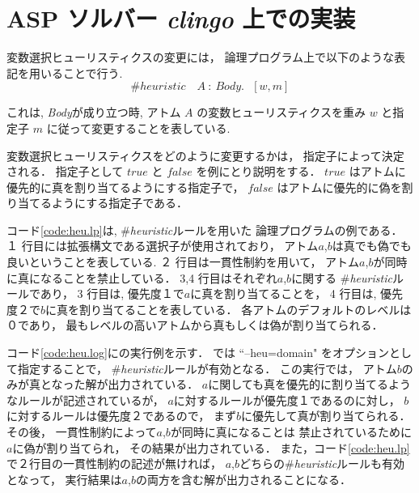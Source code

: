 \section{ASP ソルバー \textit{clingo} 上での実装}


変数選択ヒューリスティクスの変更には，
論理プログラム上で以下のような表記を用いることで行う. 
\begin{displaymath}
\#heuristic \quad A~ : ~Body. ~~~[w,m]
\end{displaymath}

これは, \textit{Body}が成り立つ時, アトム $A$ の変数ヒューリスティクスを重み
 $w$ と指定子 $m$ に従って変更することを表している. 

変数選択ヒューリスティクスをどのように変更するかは，
指定子によって決定される．
指定子として $true$ と $false$ を例にとり説明をする．
$true$ はアトムに優先的に真を割り当てるようにする指定子で，
$false$ はアトムに優先的に偽を割り当てるようにする指定子である．

コード\ref{code:heu.lp}は, \#\textit{heuristic}ルールを用いた
論理プログラムの例である．
１ 行目には拡張構文である選択子が使用されており，
アトム$a$,$b$は真でも偽でも良いということを表している. 
２ 行目は一貫性制約を用いて，
アトム$a$,$b$が同時に真になることを禁止している．
3,4 行目はそれぞれ$a$,$b$に関する
\#\textit{heuristic}ルールであり，
3 行目は, 優先度１で$a$に真を割り当てることを，
4 行目は, 優先度２で$b$に真を割り当てることを表している．
各アトムのデフォルトのレベルは０であり，
最もレベルの高いアトムから真もしくは偽が割り当てられる．

コード\ref{code:heu.log}に{\clingo}の実行例を示す．
{\clingo}では ``--heu=domain" をオプションとして指定することで，
\#\textit{heuristic}ルールが有効となる．
この実行では，
アトム$b$のみが真となった解が出力されている．
$a$に関しても真を優先的に割り当てるようなルールが記述されているが，
$a$に対するルールが優先度１であるのに対し，
$b$に対するルールは優先度２であるので，
まず$b$に優先して真が割り当てられる．
その後，
一貫性制約によって$a$,$b$が同時に真になることは
禁止されているために
$a$に偽が割り当てられ，
その結果が出力されている．
また，コード\ref{code:heu.lp}で２行目の一貫性制約の記述が無ければ，
$a$,$b$どちらの\#\textit{heuristic}ルールも有効となって，
実行結果は$a$,$b$の両方を含む解が出力されることになる．




